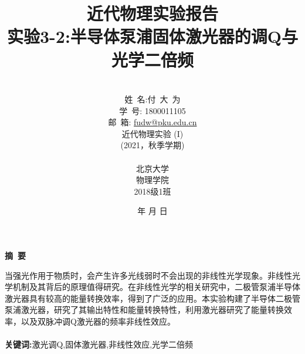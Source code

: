 \documentclass[a4paper]{article}
\begin{document}
\renewcommand{\contentsname}{目\ 录}
\renewcommand{\appendixname}{附录}
\renewcommand{\appendixpagename}{附录}
\renewcommand{\refname}{参考文献} 
\renewcommand{\figurename}{图}
\renewcommand{\tablename}{表}
\renewcommand{\today}{\number\year 年 \number\month 月 \number\day 日}

\title{{\Huge 近代物理实验报告{\large\linebreak\\}}{\Large 实验3-2:半导体泵浦固体激光器的调Q与光学二倍频\linebreak\linebreak}}
\author{\\姓\ 名:付\ 大\ 为\\
学\ 号: 1800011105\\
邮\ 箱: \url{fudw@pku.edu.cn}\\
近代物理实验 (I)\\
(2021，秋季学期)\\\\
北京大学\\
物理学院\\
2018级1班}
\date{\today}
\maketitle
\newpage

\begin{center}
{\Large\bf{摘\ 要\\}}
\end{center}

当强光作用于物质时，会产生许多光线弱时不会出现的非线性光学现象。非线性光学机制及其背后的原理值得研究。在非线性光学的相关研究中，二极管泵浦半导体激光器具有较高的能量转换效率，得到了广泛的应用。本实验构建了半导体二极管泵浦激光器，研究了其输出特性和能量转换特性，利用激光器研究了能量转换效率，以及双脉冲调Q激光器的频率非线性效应。\\\\
{\bf{关键词}:}激光调Q,固体激光器,非线性效应,光学二倍频
\newpage

\begin{center}
\tableofcontents\label{c}
\end{center}
\newpage
\end{document}
